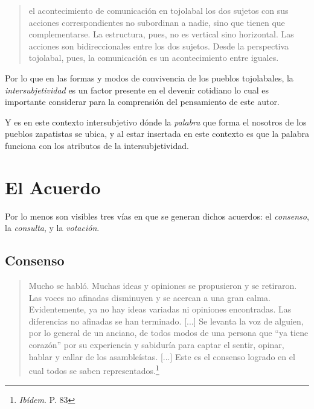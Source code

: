 \documentclass[oneside]{book}
\begin{document}
\begin{quote}
el acontecimiento de comunicación en tojolabal los dos sujetos con sus acciones correspondientes no subordinan a nadie, sino que tienen que complementarse. La estructura, pues, no es vertical sino horizontal. Las acciones son bidireccionales entre los dos sujetos. Desde la perspectiva tojolabal, pues, la comunicación es un acontecimiento entre iguales.
\end{quote}

Por lo que en las formas y modos de convivencia de los pueblos tojolabales, la \textit{intersubjetividad} es un factor presente en el devenir cotidiano lo cual es importante considerar para la comprensión del pensamiento de este autor.

Y es en este contexto intersubjetivo dónde la \textit{palabra} que forma el nosotros de los pueblos zapatistas se ubica, y al estar insertada en este contexto es que la palabra funciona con los atributos de la intersubjetividad. 

\section{El Acuerdo}

Por lo menos son visibles tres vías en que se generan dichos acuerdos: el \textit{consenso}, la \textit{consulta}, y la \textit{votación}.

\subsection{Consenso}
\begin{quote}
    Mucho se habló. Muchas ideas y opiniones se propusieron y se retiraron. Las voces no afinadas disminuyen y se acercan a una gran calma. Evidentemente, ya no hay ideas variadas ni opiniones encontradas. Las diferencias no afinadas se han terminado. [...] Se levanta la voz de alguien, por lo general de un anciano, de todos modos de una persona que “ya tiene corazón” por su experiencia y sabiduría para captar el sentir, opinar, hablar y callar de los asambleístas. [...] Este es el consenso logrado en el cual todos se saben representados.\footnote{\textit{Ibídem}. P. 83}
\end{quote}	
\end{document}
